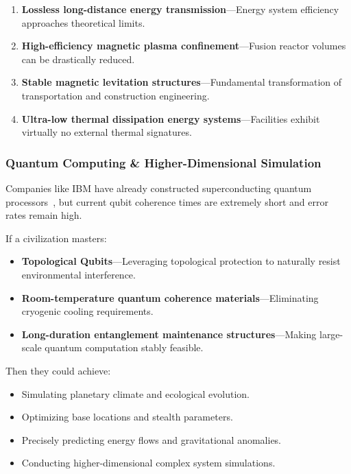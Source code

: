 \documentclass[aps,prd,twocolumn,superscriptaddress,nofootinbib]{revtex4-2}
\begin{document}
\begin{enumerate}
  \item \textbf{Lossless long-distance energy transmission}---Energy system efficiency approaches theoretical limits.
  \item \textbf{High-efficiency magnetic plasma confinement}---Fusion reactor volumes can be drastically reduced.
  \item \textbf{Stable magnetic levitation structures}---Fundamental transformation of transportation and construction engineering.
  \item \textbf{Ultra-low thermal dissipation energy systems}---Facilities exhibit virtually no external thermal signatures.
\end{enumerate}

\subsubsection{Quantum Computing \& Higher-Dimensional Simulation}\label{sec:quantum-computing}

Companies like IBM have already constructed superconducting quantum processors~\cite{IBM_Quantum}, but current qubit coherence times are extremely short and error rates remain high.

If a civilization masters:

\begin{itemize}
  \item \textbf{Topological Qubits}---Leveraging topological protection to naturally resist environmental interference.
  \item \textbf{Room-temperature quantum coherence materials}---Eliminating cryogenic cooling requirements.
  \item \textbf{Long-duration entanglement maintenance structures}---Making large-scale quantum computation stably feasible.
\end{itemize}

Then they could achieve:

\begin{itemize}
  \item Simulating planetary climate and ecological evolution.
  \item Optimizing base locations and stealth parameters.
  \item Precisely predicting energy flows and gravitational anomalies.
  \item Conducting higher-dimensional complex system simulations.
\end{itemize}
\end{document}

